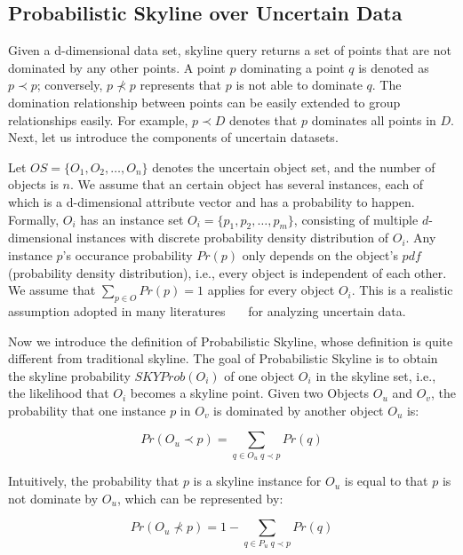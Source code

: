 \subsection{Probabilistic Skyline over Uncertain Data}
Given a d-dimensional data set, skyline query returns a set of points that are not dominated by any other points. A point \(p\) dominating a point \(q\) is denoted as \(p \prec p\); conversely, \(p \nprec p\) represents that \(p\) is not able to dominate \(q\). The domination relationship between points can be easily extended to group relationships easily. For example, \(p \prec D\) denotes that \(p\) dominates all points in \(D\). Next, let us introduce the components of uncertain datasets.

Let \(OS= \{O_{1},O_{2},\dots,O_{n}\}\) denotes the uncertain object set, and the number of objects is \(n\). We assume that an certain object has several instances, each of which is a d-dimensional attribute vector and has a probability to happen. Formally, \(O_{i}\) has an instance set \(O_{i} =\{p_{1},p_{2},\dots,p_{m}\}\), consisting of multiple \(d\)-dimensional instances with discrete probability density distribution of \(O_{i}\). Any instance \(p\)'s occurance probability \(Pr(p)\) only depends on the object's \(pdf\)(probability density distribution), i.e., every object is independent of each other. We assume that \(\sum_{p\in O}Pr(p) = 1\) applies for every object \(O_{i}\). This is a realistic assumption adopted in many literatures~\cite{pei2007}~\cite{bohm2009}~\cite{kim2011} for analyzing uncertain data.

Now we introduce the definition of Probabilistic Skyline, whose definition is quite different from traditional skyline. The goal of Probabilistic Skyline is to obtain the skyline probability \(SKYProb(O_{i})\) of one object \(O_{i}\) in the skyline set, i.e., the likelihood that \(O_{i}\) becomes a skyline point. Given two Objects \(O_{u}\) and \(O_{v}\), the probability that one instance \(p\) in \(O_{v}\) is dominated by another object \(O_{u}\) is:

\begin{equation}
Pr(O_{u} \prec p) = \sum_{q \in O_{u} \; q \prec p}Pr(q)
\end{equation}

Intuitively, the probability that \(p\) is a skyline instance for \(O_{u}\) is equal to that \(p\) is not dominate by \(O_{u}\), which can be represented by:

\begin{equation}
Pr(O_{u} \nprec p) = 1 - \sum_{q \in P_{u} \; q \prec p}Pr(q)
\end{equation}

